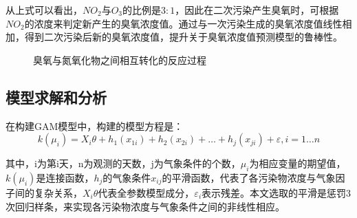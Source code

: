 \documentclass[a4paper,10pt]{my_paper}
\numberwithin{equation}{section}
\begin{document}
从上式可以看出，${NO_2}$与${O_3}$的比例是${3:1}$，因此在二次污染产生臭氧时，可根据${NO_2}$的浓度来判定新产生的臭氧浓度值。通过与一次污染生成的臭氧浓度值线性相加，得到二次污染后新的臭氧浓度值，提升关于臭氧浓度值预测模型的鲁棒性。

\begin{figure}[htbp]
  \caption{臭氧与氮氧化物之间相互转化的反应过程}\label{fig_O3}
\end{figure}


\subsection{模型求解和分析}
在构建GAM模型中，构建的模型方程是：
\begin{equation}
  k(\mu_i) = X_i\theta +h_1(x_{1i})+h_2(x_{2i})+\dots+h_j(x_{ji})+\varepsilon, i = 1\dots n
\end{equation}

其中，i为第i天，n为观测的天数，j为气象条件的个数，${\mu_i}$为相应变量的期望值，${k(\mu _i)}$是连接函数，${h_j}$的气象条件${x_{ij}}$的平滑函数，代表了各污染物浓度与气象因子间的复杂关系，${X_i\theta}$代表全参数模型成分，${\varepsilon_i}$表示残差。本文选取的平滑是惩罚3次回归样条，来实现各污染物浓度与气象条件之间的非线性相应。

\end{document}
